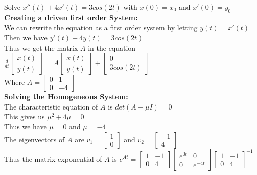 \documentclass{article}
\begin{document}
Solve $x''(t) + 4x'(t) = 3cos(2t)$ with $x(0) = x_0$ and $x'(0) = y_0$\\
\textbf{Creating a driven first order System:}\\
We can rewrite the equation as a first order system by letting $y(t) = x'(t)$\\
Then we have $y'(t) + 4y(t) = 3cos(2t)$\\
Thus we get the matrix $A$ in the equation $\frac{d}{dt}\begin{bmatrix}
    x(t)\\
    y(t)
\end{bmatrix} = A\begin{bmatrix}
    x(t)\\
    y(t)
\end{bmatrix} + \begin{bmatrix}
    0\\
    3cos(2t)
\end{bmatrix}$\\
Where $A = \begin{bmatrix}
    0 & 1\\
    0 & -4
\end{bmatrix}$\\
\textbf{Solving the Homogeneous System:}\\
The characteristic equation of $A$ is $det(A - \mu I) = 0$\\
This gives us $\mu^2 + 4\mu = 0$\\
Thus we have $\mu = 0$ and $\mu = -4$ \\
The eigenvectors of $A$ are $v_1 = \begin{bmatrix}
    1\\
    0
\end{bmatrix}$ and $v_2 = \begin{bmatrix}
    -1\\
    4
\end{bmatrix}$\\
Thus the matrix exponential of $A$ is $e^{At} = \begin{bmatrix}
    1 & -1\\
    0 & 4
\end{bmatrix}\begin{bmatrix}
    e^{0t} & 0\\
    0 & e^{-4t}
\end{bmatrix} \begin{bmatrix}
    1 & -1\\
    0 & 4
\end{bmatrix}^{-1}$\\
\end{document}
